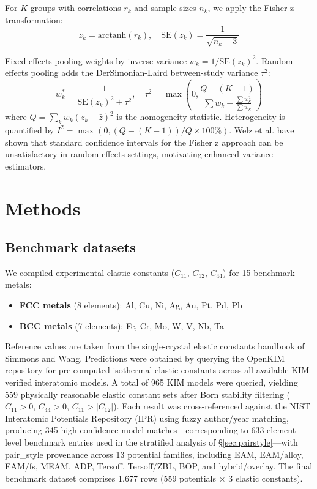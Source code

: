 \documentclass[twocolumn,9pt]{extarticle}
\begin{document}
For $K$ groups with correlations $r_k$ and sample sizes $n_k$, we apply the Fisher z-transformation:
\begin{equation}
z_k = \text{arctanh}(r_k), \quad \text{SE}(z_k) = \frac{1}{\sqrt{n_k - 3}}
\end{equation}

Fixed-effects pooling weights by inverse variance $w_k = 1/\text{SE}(z_k)^2$. Random-effects pooling adds the DerSimonian-Laird between-study variance $\tau^2$:
\begin{equation}
w_k^* = \frac{1}{\text{SE}(z_k)^2 + \tau^2}, \quad \tau^2 = \max\left(0, \frac{Q - (K-1)}{\sum w_k - \frac{\sum w_k^2}{\sum w_k}}\right)
\end{equation}
where $Q = \sum_k w_k (z_k - \bar{z})^2$ is the homogeneity statistic. Heterogeneity is quantified by $I^2 = \max(0, (Q - (K-1))/Q \times 100\%)$\cite{higgins2003}. Welz et al.\cite{welz2022} have shown that standard confidence intervals for the Fisher z approach can be unsatisfactory in random-effects settings, motivating enhanced variance estimators.

\section{Methods}

\subsection{Benchmark datasets}

We compiled experimental elastic constants ($C_{11}$, $C_{12}$, $C_{44}$) for 15 benchmark metals:
\begin{itemize}
\item \textbf{FCC metals} (8 elements): Al, Cu, Ni, Ag, Au, Pt, Pd, Pb
\item \textbf{BCC metals} (7 elements): Fe, Cr, Mo, W, V, Nb, Ta
\end{itemize}
Reference values are taken from the single-crystal elastic constants handbook of Simmons and Wang\cite{simmons1971}. Predictions were obtained by querying the OpenKIM repository\cite{openkim} for pre-computed isothermal elastic constants across all available KIM-verified interatomic models. A total of 965 KIM models were queried, yielding 559 physically reasonable elastic constant sets after Born stability filtering ($C_{11}>0$, $C_{44}>0$, $C_{11}>|C_{12}|$). Each result was cross-referenced against the NIST Interatomic Potentials Repository (IPR)\cite{nist_ipr} using fuzzy author/year matching, producing 345 high-confidence model matches---corresponding to 633 element-level benchmark entries used in the stratified analysis of \S\ref{sec:pairstyle}---with pair\_style provenance across 13 potential families, including EAM, EAM/alloy, EAM/fs, MEAM, ADP, Tersoff, Tersoff/ZBL, BOP, and hybrid/overlay. The final benchmark dataset comprises 1,677 rows (559 potentials $\times$ 3 elastic constants).
\end{document}
